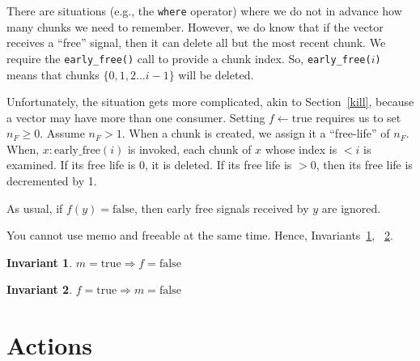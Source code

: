 \documentclass[letterpaper,12pt]{article}
\newtheorem{invariant}{Invariant}
\begin{document}
There are situations (e.g., the {\tt where} operator) where we do not 
in advance how many chunks we need to remember. However, we do know 
that if the vector receives a ``free'' signal, then it can delete all but the
most recent chunk. We require the {\tt early\_free()} call to provide a chunk index.
So, {\tt early\_free(\(i\))} means that chunks \(\{0, 1, 2 \ldots i-1\}\) 
will be deleted.  

Unfortunately, the situation gets more complicated, akin to Section~\ref{kill},
because a vector may have more than one consumer. Setting \(f \leftarrow
\mathrm{true}\) requires us to set \(n_F \geq 0\). Assume \(n_F > 1\). When a
chunk is created, we assign it a ``free-life'' of \(n_F\). When,
\(x:\mathrm{early\_free}(i)\) is invoked, each chunk of \(x\) whose index is \(< i\) is
examined. If its free life is 0, it is deleted. If its free life is \(> 0\),
then its free life is decremented by 1.

As usual, if \(f(y) = \mathrm{false}\), then early free signals received by \(y\) are ignored.

You cannot use memo and freeable at the same time. 
Hence, Invariants~\ref{f_3}, ~\ref{f_4}.

\begin{invariant}
\label{f_3}
  \(m = \mathrm{true} \Rightarrow f = \mathrm{false}\)
\end{invariant}

\begin{invariant}
\label{f_4}
  \(f = \mathrm{true} \Rightarrow m = \mathrm{false}\)
\end{invariant}

\section{Actions}
\end{document}
